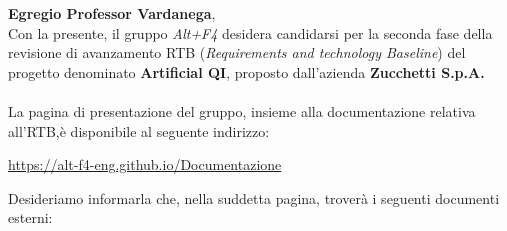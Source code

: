 \documentclass[a4paper, 12pt]{article}
\begin{document}
\primapagina

\newpage

\noindent
\textbf{Egregio Professor Vardanega}, \\
Con la presente, il gruppo \textit{Alt+F4} desidera candidarsi per la seconda fase della revisione di avanzamento RTB (\textit{Requirements and technology Baseline}) del progetto denominato \textbf{Artificial QI}, proposto dall'azienda  \textbf{Zucchetti S.p.A.}\\
\\
La pagina di presentazione del gruppo, insieme alla documentazione relativa all'RTB,è disponibile al seguente indirizzo: 
\begin{center}
    \href{https://alt-f4-eng.github.io/Documentazione}{https://alt-f4-eng.github.io/Documentazione}\\
\end{center}
Desideriamo informarla che, nella suddetta pagina, troverà i seguenti documenti esterni:
\end{document}

